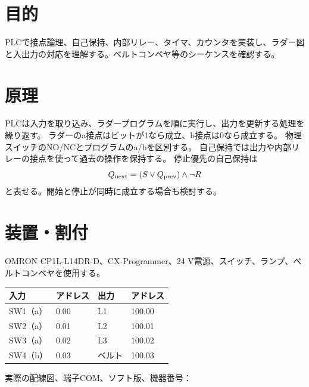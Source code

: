 \documentclass[lualatex,a4paper,10pt]{jlreq}
\begin{document}
\reporttitle
{}

\section{目的}\label{sec:auto1}
PLCで接点論理、自己保持、内部リレー、タイマ、カウンタを実装し、ラダー図と入出力の対応を理解する。ベルトコンベヤ等のシーケンスを確認する。
\section{原理}\label{sec:auto2}
PLCは入力を取り込み、ラダープログラムを順に実行し、出力を更新する処理を繰り返す。
ラダーのa接点はビットが1なら成立、b接点は0なら成立する。
物理スイッチのNO/NCとプログラムのa/bを区別する。
自己保持では出力や内部リレーの接点を使って過去の操作を保持する。
停止優先の自己保持は
\[
 Q_{\rm next}=(S\lor Q_{\rm prev})\land\lnot R
\]
と表せる。開始と停止が同時に成立する場合も検討する。
\section{装置・割付}\label{sec:auto3}
OMRON CP1L-L14DR-D、CX-Programmer、24 V電源、スイッチ、ランプ、ベルトコンベヤを使用する。
\par\noindent\begin{tabularx}{\linewidth}{YYYY}
\toprule 入力 & アドレス & 出力 & アドレス\\\midrule
SW1（a）&0.00&L1&100.00\\SW2（a）&0.01&L2&100.01\\
SW3（a）&0.02&L3&100.02\\SW4（b）&0.03&ベルト&100.03\\\bottomrule
\end{tabularx}
実際の配線図、端子COM、ソフト版、機器番号：
\writing{18mm}
\end{document}
